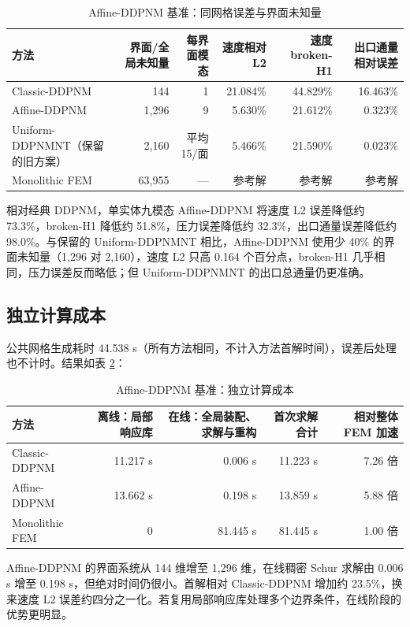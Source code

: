\documentclass[11pt,a4paper]{ctexart}
\newcommand{\Dd}{DDPNM}
\begin{document}
\begin{table}[h]
\centering
\caption{Affine-\Dd{} 基准：同网格误差与界面未知量}
\label{tab:affine-errors}
\begin{tabular}{lrrrrr}
\toprule
方法 & 界面/全局未知量 & 每界面模态 & 速度相对 L2 & 速度 broken-H1 & 出口通量相对误差 \\
\midrule
Classic-\Dd{}       & 144        & 1 & 21.084\% & 44.829\% & 16.463\% \\
Affine-\Dd{}        & 1{,}296    & 9 & 5.630\%  & 21.612\% & 0.323\% \\
Uniform-\Dd{}NT（保留的旧方案） & 2{,}160 & 平均 15/面 & 5.466\% & 21.590\% & 0.023\% \\
Monolithic FEM     & 63{,}955   & --- & 参考解 & 参考解 & 参考解 \\
\bottomrule
\end{tabular}
\end{table}

相对经典 \Dd{}，单实体九模态 Affine-\Dd{} 将速度 L2 误差降低约 73.3\%，broken-H1 降低约 51.8\%，压力误差降低约 32.3\%，出口通量误差降低约 98.0\%。与保留的 Uniform-\Dd{}NT 相比，Affine-\Dd{} 使用少 40\% 的界面未知量（1{,}296 对 2{,}160），速度 L2 只高 0.164 个百分点，broken-H1 几乎相同，压力误差反而略低；但 Uniform-\Dd{}NT 的出口总通量仍更准确。

\subsection{独立计算成本}
\label{sec:affine-cost}

公共网格生成耗时 44.538 s（所有方法相同，不计入方法首解时间），误差后处理也不计时。结果如表 \ref{tab:affine-cost}：

\begin{table}[h]
\centering
\caption{Affine-\Dd{} 基准：独立计算成本}
\label{tab:affine-cost}
\begin{tabular}{lrrrr}
\toprule
方法 & 离线：局部响应库 & 在线：全局装配、求解与重构 & 首次求解合计 & 相对整体 FEM 加速 \\
\midrule
Classic-\Dd{} & 11.217 s & 0.006 s & 11.223 s & 7.26 倍 \\
Affine-\Dd{}  & 13.662 s & 0.198 s & 13.859 s & 5.88 倍 \\
Monolithic FEM & 0      & 81.445 s & 81.445 s & 1.00 倍 \\
\bottomrule
\end{tabular}
\end{table}

Affine-\Dd{} 的界面系统从 144 维增至 1{,}296 维，在线稠密 Schur 求解由 0.006 s 增至 0.198 s，但绝对时间仍很小。首解相对 Classic-\Dd{} 增加约 23.5\%，换来速度 L2 误差约四分之一化。若复用局部响应库处理多个边界条件，在线阶段的优势更明显。
\end{document}
